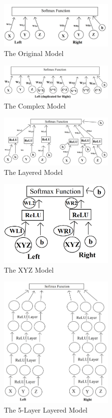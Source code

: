\documentclass[]{report}
\begin{document}
\begin{figure}
	\centering
	\includegraphics[width=0.5\textwidth]{../images/original}
	\caption{The Original Model}
	\label{original-model}
\end{figure}
\begin{figure}
	\centering
	\includegraphics[width=0.5\textwidth]{../images/complex}
		\caption{The Complex Model}
	\label{complex-model}
\end{figure}
\begin{figure}
	\centering
	\includegraphics[width=0.5\textwidth]{../images/layered}
	\caption{The Layered Model}
	\label{layered-model}
\end{figure}
\begin{figure}
	\centering
	\includegraphics[width=0.5\textwidth]{../images/xyz1}
	\caption{The XYZ Model}
	\label{xyz-model}
\end{figure}
\begin{figure}
	\centering
	\includegraphics[width=0.5\textwidth]{../images/layered5}
	\caption{The 5-Layer Layered Model}
	\label{layered5-model}
\end{figure}
\end{document}

